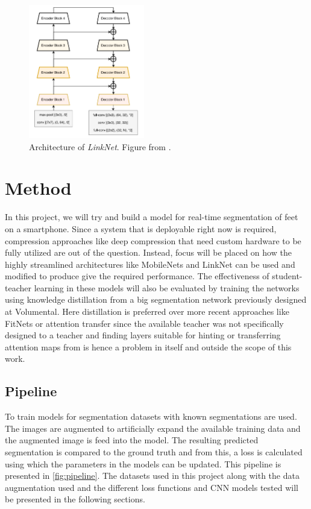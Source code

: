 \documentclass{kththesis}
\begin{document}
\begin{figure}[h]
  \centering
  \includegraphics[width=0.45\textwidth]{LinkNet}
  \caption{Architecture of \textit{LinkNet}. Figure from \textcite{chaurasia2017linknet}.}
  \label{fig:LinkNet}
\end{figure}


\chapter{Method} \label{chap:method}

In this project, we will try and build a model for real-time segmentation of feet
on a smartphone. Since a system that is deployable right now is required,
compression approaches like deep compression that need custom hardware to be
fully utilized are out of the question. Instead, focus will be placed on how
the highly streamlined architectures like MobileNets and LinkNet can be used and
modified to produce give the required performance. The effectiveness of
student-teacher learning in these models will also be evaluated by training the
networks using knowledge distillation from a big segmentation network previously
designed at Volumental. Here distillation is preferred over more recent
approaches like FitNets or attention transfer since the available teacher was
not specifically designed to a teacher and finding layers suitable for hinting or
transferring attention maps from is hence a problem in itself and outside the
scope of this work.%

\section{Pipeline}
To train models for segmentation datasets with known segmentations are used. The
images are augmented to artificially expand the available training data and the
augmented image is feed into the model. The resulting predicted segmentation
is compared to the ground truth and from this, a loss is calculated using which
the parameters in the models can be updated. This pipeline is presented in
\cref{fig:pipeline}. The datasets used in this project along with the data
augmentation used and the different loss functions and CNN models tested will be
presented in the following sections.
\end{document}
